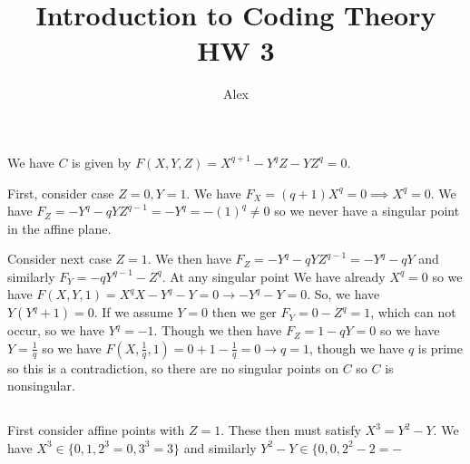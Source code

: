 \documentclass{article}
\title{Introduction to Coding Theory HW 3}
\author{Alex}
\begin{document}
\maketitle
\section{}
    \subsection{}
        We have \(C\) is given by \(F(X,Y,Z) = X^{q+1}-Y^qZ-YZ^q=0\).

        First, consider case \(Z=0, Y=1\).
        We have \(F_X=(q+1)X^q=0\implies X^q = 0\).
        We have \(F_Z=-Y^q-qYZ^{q-1}=-Y^q=-(1)^q\ne 0\) so we never have
        a singular point in the affine plane.

        Consider next case \(Z=1\). We then have \(F_Z=-Y^q-qYZ^{q-1}=
        -Y^q-qY\) and similarly \(F_Y=-qY^{q-1}-Z^q\). At any singular point
        We have already \(X^q=0\) so we have \(F(X,Y,1)=X^qX-Y^q-Y=0\rightarrow
        -Y^q-Y=0\). So, we have \(Y(Y^q+1)=0\). If we assume \(Y=0\) then we 
        ger $F_Y=0-Z^q=1$, which can not occur, so we have \(Y^q=-1\). Though
        we then have \(F_Z=1-qY=0\) so we have \(Y=\frac1q\) so we have 
        \(F\left(X,\frac1q,1\right)= 0+1-\frac1q=0\rightarrow q = 1\), though
        we have $q$ is prime so this is a contradiction, so there are no
        singular points on $C$ so $C$ is nonsingular.
    \subsection{}
        First consider affine points with \(Z=1\). These then must satisfy
        \(X^3=Y^2-Y\). We have $X^3\in\{0,1,2^3=0,3^3=3\}$ and similarly
        $Y^2-Y\in\{0,0,2^2-2=-$
\end{document}
